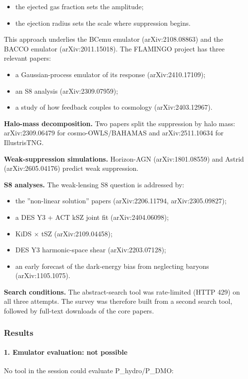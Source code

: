 \documentclass[11pt,a4paper]{article}
\begin{document}
\begin{itemize}
  \item the ejected gas fraction sets the amplitude;
  \item the ejection radius sets the scale where suppression begins.
\end{itemize}
This approach underlies the BCemu emulator (arXiv:2108.08863) and the BACCO emulator (arXiv:2011.15018). The FLAMINGO project has three relevant papers:

\begin{itemize}
  \item a Gaussian-process emulator of its response (arXiv:2410.17109);
  \item an S8 analysis (arXiv:2309.07959);
  \item a study of how feedback couples to cosmology (arXiv:2403.12967).
\end{itemize}
\textbf{Halo-mass decomposition.} Two papers split the suppression by halo mass: arXiv:2309.06479 for cosmo-OWLS/BAHAMAS and arXiv:2511.10634 for IllustrisTNG.

\textbf{Weak-suppression simulations.} Horizon-AGN (arXiv:1801.08559) and Astrid (arXiv:2605.04176) predict weak suppression.

\textbf{S8 analyses.} The weak-lensing S8 question is addressed by:

\begin{itemize}
  \item the ''non-linear solution'' papers (arXiv:2206.11794, arXiv:2305.09827);
  \item a DES Y3 + ACT kSZ joint fit (arXiv:2404.06098);
  \item KiDS $\times$ tSZ (arXiv:2109.04458);
  \item DES Y3 harmonic-space shear (arXiv:2203.07128);
  \item an early forecast of the dark-energy bias from neglecting baryons (arXiv:1105.1075).
\end{itemize}
\textbf{Search conditions.} The abstract-search tool was rate-limited (HTTP 429) on all three attempts. The survey was therefore built from a second search tool, followed by full-text downloads of the core papers.

\subsubsection*{Results}
\paragraph{1. Emulator evaluation: not possible}
No tool in the session could evaluate P\_hydro/P\_DMO:
\end{document}
